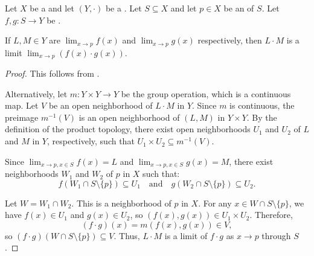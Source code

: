 \begin{proposition} \label{proposition:limits_for_maps_from_a_topological_space_to_a_topological_group_respect_the_group_structure}

    Let $X$ be a  and let $(Y,\cdot)$ be a . Let $S \subseteq X$ and let $p \in X$ be an  of $S$. Let $f,g : S \to Y$ be .

    If $L,M \in Y$ are  $\lim_{x \to p} f(x)$ and $\lim_{x \to p} g(x)$ respectively, then $L \cdot M$ is a limit $\lim_{x \to p} (f(x) \cdot g(x)).$

\end{proposition}
\begin{proof}
    This follows from .

    Alternatively, let $m: Y \times Y \to Y$ be the group operation, which is a continuous map. Let $V$ be an open neighborhood of $L \cdot M$ in $Y$. Since $m$ is continuous, the preimage $m^{-1}(V)$ is an open neighborhood of $(L, M)$ in $Y \times Y$. By the definition of the product topology, there exist open neighborhoods $U_1$ and $U_2$ of $L$ and $M$ in $Y$, respectively, such that $U_1 \times U_2 \subseteq m^{-1}(V)$.

    Since $\lim_{x \to p, x \in S} f(x) = L$ and $\lim_{x \to p, x \in S} g(x) = M$, there exist neighborhoods $W_1$ and $W_2$ of $p$ in $X$ such that:
    \[ f(W_1 \cap S \setminus \{p\}) \subseteq U_1 \quad \text{and} \quad g(W_2 \cap S \setminus \{p\}) \subseteq U_2. \]

    Let $W = W_1 \cap W_2$. This is a neighborhood of $p$ in $X$. For any $x \in W \cap S \setminus \{p\}$, we have $f(x) \in U_1$ and $g(x) \in U_2$, so $(f(x), g(x)) \in U_1 \times U_2$. Therefore,
    \[ (f \cdot g)(x) = m(f(x), g(x)) \in V, \]
    so $(f \cdot g)(W \cap S \setminus \{p\}) \subseteq V$.
    Thus, $L \cdot M$ is a limit of $f \cdot g$ as $x \to p$ through $S$.
\end{proof}